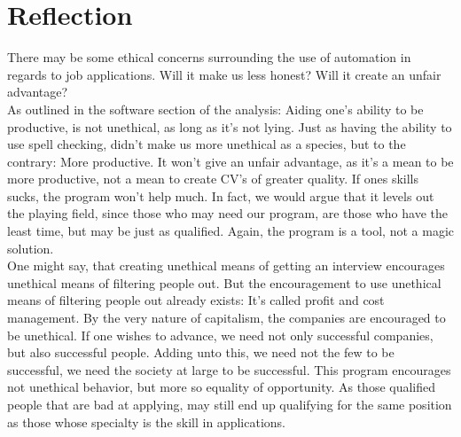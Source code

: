 \section{Reflection}
There may be some ethical concerns surrounding the use of automation in regards to job applications.
Will it make us less honest? Will it create an unfair advantage?\\
As outlined in the software section of the analysis: Aiding one's ability to be productive, is not unethical, as long as it's not lying.
Just as having the ability to use spell checking, didn't make us more unethical as a species, but to the contrary: More productive.
It won't give an unfair advantage, as it's a mean to be more productive, not a mean to create CV's of greater quality. If ones skills sucks, the program won't help much.
In fact, we would argue that it levels out the playing field, since those who may need our program, are those who have the least time, but may be just as qualified. Again, the program is a tool, not a magic solution.\\

One might say, that creating unethical means of getting an interview encourages unethical means of filtering people out.
But the encouragement to use unethical means of filtering people out already exists:
It's called profit and cost management. By the very nature of capitalism, the companies are encouraged to be unethical.
If one wishes to advance, we need not only successful companies, but also successful people.
Adding unto this, we need not the few to be successful, we need the society at large to be successful. This program encourages not unethical behavior, but more so equality of opportunity.
As those qualified people that are bad at applying, may still end up qualifying for the same position as those whose specialty is the skill in applications.
\newpage